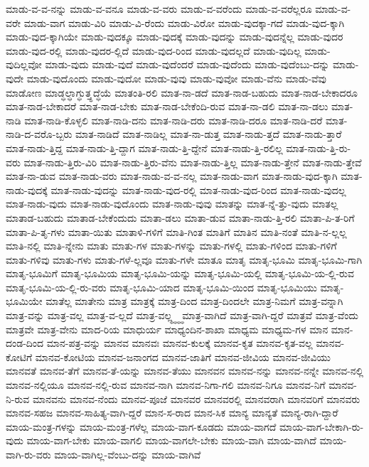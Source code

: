 {ಮಾಡು-ವ-ವ-ನನ್ನು
ಮಾಡು-ವ-ವನೂ
ಮಾಡು-ವ-ವರು
ಮಾಡು-ವ-ವರೆಂದು
ಮಾಡು-ವ-ವರೆಲ್ಲರೂ
ಮಾಡು-ವ-ವರೇ
ಮಾಡು-ವಾಗ
ಮಾಡು-ವಿರಿ
ಮಾಡು-ವಿ-ರೆಂದು
ಮಾಡು-ವಿರೋ
ಮಾಡು-ವುದಕ್ಕಾ-ಗದೆ
ಮಾಡು-ವುದ-ಕ್ಕಾಗಿ
ಮಾಡು-ವುದ-ಕ್ಕಾಗಿಯೇ
ಮಾಡು-ವುದಕ್ಕೂ
ಮಾಡು-ವುದಕ್ಕೆ
ಮಾಡು-ವುದನ್ನು
ಮಾಡು-ವುದನ್ನೆಲ್ಲ
ಮಾಡು-ವುದರ
ಮಾಡು-ವುದ-ರಲ್ಲಿ
ಮಾಡು-ವುದರ-ಲ್ಲಿದೆ
ಮಾಡು-ವುದ-ರಿಂದ
ಮಾಡು-ವುದಲ್ಲದೆ
ಮಾಡು-ವುದಿಲ್ಲ
ಮಾಡು-ವುದಿಲ್ಲವೋ
ಮಾಡು-ವುದು
ಮಾಡು-ವುದೆ
ಮಾಡು-ವುದೆಂದರೆ
ಮಾಡು-ವುದೆಂದು
ಮಾಡು-ವುದೆಂಬು-ದನ್ನು
ಮಾಡು-ವುದೇ
ಮಾಡು-ವುದೊಂದು
ಮಾಡು-ವುದೋ
ಮಾಡು-ವುವು
ಮಾಡು-ವುವೋ
ಮಾಡು-ವೆನು
ಮಾಡು-ವೆವು
ಮಾಡೋಣ
ಮಾಡ್ಧಲ್ಧಾಗ್ಧುತ್ತ್ಧದ್ಧೆಯೆ
ಮಾತಂತಿ-ರಲಿ
ಮಾತ-ನಾ-ಡದೆ
ಮಾತ-ನಾಡ-ಬಹುದು
ಮಾತ-ನಾಡ-ಬೇಕಾದರೂ
ಮಾತ-ನಾಡ-ಬೇಕಾದರೆ
ಮಾತ-ನಾಡ-ಬೇಕು
ಮಾತ-ನಾಡ-ಬೇಕೆಂದಿ-ರುವ
ಮಾತ-ನಾ-ಡಲಿ
ಮಾತ-ನಾ-ಡಲು
ಮಾತ-ನಾಡಿ
ಮಾತ-ನಾಡಿ-ಕೊಳ್ಳಲಿ
ಮಾತ-ನಾಡಿ-ದನು
ಮಾತ-ನಾಡಿ-ದರು
ಮಾತ-ನಾಡಿ-ದರೂ
ಮಾತ-ನಾಡಿ-ದರೆ
ಮಾತ-ನಾಡಿ-ದ-ವರೊ-ಬ್ಬರು
ಮಾತ-ನಾಡಿದೆ
ಮಾತ-ನಾಡಿಲ್ಲ
ಮಾತ-ನಾ-ಡುತ್ತ
ಮಾತ-ನಾಡು-ತ್ತದೆ
ಮಾತ-ನಾಡು-ತ್ತಾರೆ
ಮಾತ-ನಾಡು-ತ್ತಿದ್ದ
ಮಾತ-ನಾಡು-ತ್ತಿ-ದ್ದಾಗ
ಮಾತ-ನಾಡು-ತ್ತಿ-ದ್ದೇನೆ
ಮಾತ-ನಾಡು-ತ್ತಿ-ರಲಿಲ್ಲ
ಮಾತ-ನಾಡು-ತ್ತಿ-ರು-ವರು
ಮಾತ-ನಾಡು-ತ್ತಿರು-ವಿರಿ
ಮಾತ-ನಾಡು-ತ್ತಿರು-ವೆನು
ಮಾತ-ನಾಡು-ತ್ತಿಲ್ಲ
ಮಾತ-ನಾಡು-ತ್ತೇನೆ
ಮಾತ-ನಾಡು-ತ್ತೇವೆ
ಮಾತ-ನಾ-ಡುವ
ಮಾತ-ನಾಡು-ವರು
ಮಾತ-ನಾಡು-ವ-ವ-ನಲ್ಲ
ಮಾತ-ನಾಡು-ವಾಗ
ಮಾತ-ನಾಡು-ವುದ-ಕ್ಕಾಗಿ
ಮಾತ-ನಾಡು-ವುದಕ್ಕೆ
ಮಾತ-ನಾಡು-ವುದನ್ನು
ಮಾತ-ನಾಡು-ವುದ-ರಲ್ಲಿ
ಮಾತ-ನಾಡು-ವುದ-ರಿಂದ
ಮಾತ-ನಾಡು-ವುದಲ್ಲ
ಮಾತ-ನಾಡು-ವುದು
ಮಾತ-ನಾಡು-ವುದೊಂದು
ಮಾತ-ನಾಡು-ವುವು
ಮಾತನ್ನು
ಮಾತ-ನ್ನೆ-ತ್ತು-ವುದು
ಮಾತಲ್ಲ
ಮಾತಾಡ-ಬಹುದು
ಮಾತಾಡ-ಬೇಕೆಂದುದು
ಮಾತಾ-ಡಲು
ಮಾತಾ-ಡುವ
ಮಾತಾ-ನಾಡು-ತ್ತಿ-ರಲಿ
ಮಾತಾ-ಪಿ-ತ-ರಿಗೆ
ಮಾತಾ-ಪಿ-ತೃ-ಗಳು
ಮಾತಾ-ಯಿತು
ಮಾತಾಳಿ-ಗಳಿಗೆ
ಮಾತಿ-ಗಿಂತ
ಮಾತಿಗೆ
ಮಾತಿನ
ಮಾತಿ-ನಂತೆ
ಮಾತಿ-ನ-ಲ್ಲಲ್ಲ
ಮಾತಿ-ನಲ್ಲಿ
ಮಾತಿ-ನ್ನೇನು
ಮಾತು
ಮಾತು-ಗಳ
ಮಾತು-ಗಳನ್ನು
ಮಾತು-ಗಳಲ್ಲಿ
ಮಾತು-ಗಳಿಂದ
ಮಾತು-ಗಳಿಗೆ
ಮಾತು-ಗಳಿವು
ಮಾತು-ಗಳು
ಮಾತು-ಗಳೆ-ಲ್ಲವೂ
ಮಾತು-ಗಳೇ
ಮಾತೂ
ಮಾತೃ
ಮಾತೃ-ಭೂಮಿ
ಮಾತೃ-ಭೂಮಿ-ಗಾಗಿ
ಮಾತೃ-ಭೂಮಿಗೆ
ಮಾತೃ-ಭೂಮಿಯ
ಮಾತೃ-ಭೂಮಿ-ಯನ್ನು
ಮಾತೃ-ಭೂಮಿ-ಯಲ್ಲಿ
ಮಾತೃ-ಭೂಮಿ-ಯ-ಲ್ಲಿ-ರುವ
ಮಾತೃ-ಭೂಮಿ-ಯ-ಲ್ಲಿ-ರು-ವರು
ಮಾತೃ-ಭೂಮಿ-ಯಾದ
ಮಾತೃ-ಭೂಮಿ-ಯಿಂದ
ಮಾತೃ-ಭೂಮಿಯು
ಮಾತೃ-ಭೂಮಿಯೇ
ಮಾತೆಲ್ಲ
ಮಾತೇನು
ಮಾತ್ರ
ಮಾತ್ರಕ್ಕೆ
ಮಾತ್ರ-ದಿಂದ
ಮಾತ್ರ-ದಿಂದಲೇ
ಮಾತ್ರ-ನಿಮಗೆ
ಮಾತ್ರ-ವನ್ನಾಗಿ
ಮಾತ್ರ-ವನ್ನು
ಮಾತ್ರ-ವಲ್ಲ
ಮಾತ್ರ-ವ-ಲ್ಲದೆ
ಮಾತ್ರ-ವಲ್ಲ್ಧ್ಧ್ಧ್ಧ
ಮಾತ್ರ-ವಾಗಿದೆ
ಮಾತ್ರ-ವಾಗಿ-ದ್ದರೆ
ಮಾತ್ರವೆ
ಮಾತ್ರ-ವೆಂದು
ಮಾತ್ರವೇ
ಮಾತ್ರ-ವೇನು
ಮಾದ-ರಿಯ
ಮಾಧುರ್ಯ
ಮಾಧ್ಯಂದಿನ-ಶಾಖಾ
ಮಾಧ್ಯಮ
ಮಾಧ್ಯಮ-ಗಳ
ಮಾನ
ಮಾನ-ದಂಡ-ದಿಂದ
ಮಾನ-ಪತ್ರ-ವನ್ನು
ಮಾನವ
ಮಾನವಃ
ಮಾನವ-ಕುಲಕ್ಕೆ
ಮಾನವ-ಕೃತ
ಮಾನವ-ಕೃತ-ವಲ್ಲ
ಮಾನವ-ಕೋಟಿಗೆ
ಮಾನವ-ಕೋಟಿಯ
ಮಾನವ-ಜನಾಂಗದ
ಮಾನವ-ಜಾತಿಗೆ
ಮಾನವ-ಜೀವಿಯ
ಮಾನವ-ಜೀವಿಯು
ಮಾನವತೆ
ಮಾನವ-ತೆಗೆ
ಮಾನವ-ತೆ-ಯನ್ನು
ಮಾನವ-ತೆಯು
ಮಾನವನ
ಮಾನವ-ನನ್ನು
ಮಾನವ-ನನ್ನೇ
ಮಾನವ-ನಲ್ಲಿ
ಮಾನವ-ನಲ್ಲಿಯೂ
ಮಾನವ-ನಲ್ಲಿ-ರುವ
ಮಾನವ-ನಾಗಿ
ಮಾನವ-ನಿಗಾ-ಗಲಿ
ಮಾನವ-ನಿಗೂ
ಮಾನವ-ನಿಗೆ
ಮಾನವ-ನಿ-ರುವ
ಮಾನವನು
ಮಾನವ-ನೆಂದು
ಮಾನವ-ಪೂಜೆ
ಮಾನವರ
ಮಾನವರಲ್ಲಿ
ಮಾನವರಾಗಿ
ಮಾನವರಿಗೆ
ಮಾನವರು
ಮಾನವ-ಸಹಜ
ಮಾನವ-ಸಾಹಿತ್ಯ-ವಾಗಿ-ದ್ದರೆ
ಮಾನ-ಸ-ರಾದ
ಮಾನ-ಸಿಕ
ಮಾನ್ಯ
ಮಾನ್ಯತೆ
ಮಾನ್ಯ-ರಾಗಿ-ದ್ದಾರೆ
ಮಾಯ-ಮಂತ್ರ-ಗಳನ್ನು
ಮಾಯ-ಮಂತ್ರ-ಗಳೆಲ್ಲ
ಮಾಯ-ವಾಗ-ಕೂಡದು
ಮಾಯ-ವಾಗದೆ
ಮಾಯ-ವಾಗ-ಬೇಕಾಗಿ-ರು-ವುದು
ಮಾಯ-ವಾಗ-ಬೇಕು
ಮಾಯ-ವಾಗಲಿ
ಮಾಯ-ವಾಗಲೇ-ಬೇಕು
ಮಾಯ-ವಾಗಿ
ಮಾಯ-ವಾಗಿದೆ
ಮಾಯ-ವಾಗಿ-ರು-ವರು
ಮಾಯ-ವಾಗಿಲ್ಲ-ವೆಂಬು-ದನ್ನು
ಮಾಯ-ವಾಗಿವೆ
}
